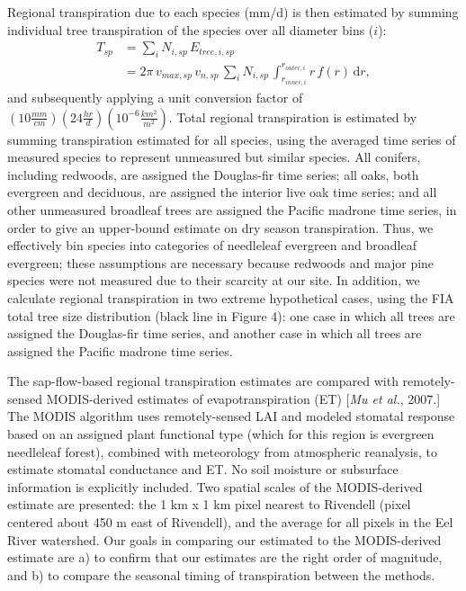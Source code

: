 Regional transpiration due to each species (mm/d) is then estimated by summing individual tree transpiration of the species over all diameter bins ($i$):
\begin{align}
T_{sp} &= \sum_{i} N_{i,sp} \, E_{tree,i,sp} \nonumber \\
&= 2\pi \, v_{max,sp} \, v_{n,sp} \, \sum_{i} N_{i,sp} \, \int_{r_{inner,i}}^{r_{outer,i}}  r \, f(r) \, \mathrm{d}r ,
\end{align}
and subsequently applying a unit conversion factor of $(10 \tfrac{mm}{cm}) (24 \tfrac{hr}{d}) (10^{-6} \tfrac{km^2}{m^2})$.  Total regional transpiration is estimated by summing transpiration estimated for all species, using the averaged time series of measured species to represent unmeasured but similar species.  All conifers, including redwoods, are assigned the Douglas-fir time series; all oaks, both evergreen and deciduous, are assigned the interior live oak time series; and all other unmeasured broadleaf trees are assigned the Pacific madrone time series, in order to give an upper-bound estimate on dry season transpiration.  Thus, we effectively bin species into categories of needleleaf evergreen and broadleaf evergreen; these assumptions are necessary because redwoods and major pine species were not measured due to their scarcity at our site.  In addition, we calculate regional transpiration in two extreme hypothetical cases, using the FIA total tree size distribution (black line in Figure 4): one case in which all trees are assigned the Douglas-fir time series, and another case in which all trees are assigned the Pacific madrone time series. 

The sap-flow-based regional transpiration estimates are compared with remotely-sensed MODIS-derived estimates of evapotranspiration (ET) [\textit{Mu et al.}, 2007.]  The MODIS algorithm uses remotely-sensed LAI and modeled stomatal response based on an assigned plant functional type (which for this region is evergreen needleleaf forest), combined with meteorology from atmospheric reanalysis, to estimate stomatal conductance and ET.  No soil moisture or subsurface information is explicitly included.  Two spatial scales of the MODIS-derived estimate are presented: the 1 km x 1 km pixel nearest to Rivendell (pixel centered about 450 m east of Rivendell), and the average for all pixels in the Eel River watershed.  Our goals in comparing our estimated to the MODIS-derived estimate are a) to confirm that our estimates are the right order of magnitude, and b) to compare the seasonal timing of transpiration between the methods.
